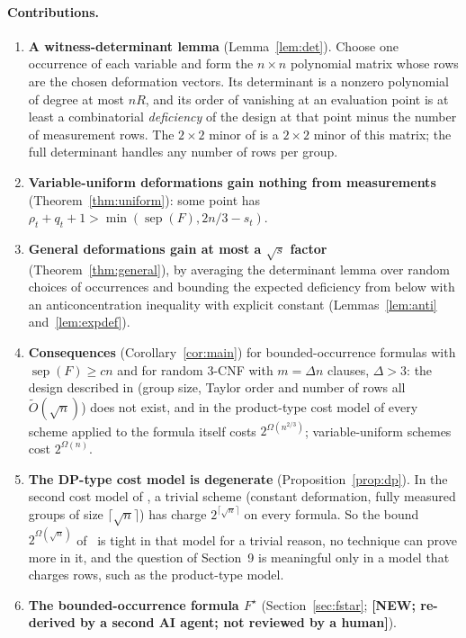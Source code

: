 \documentclass[11pt,a4paper]{article}
\newcommand{\NEWR}{\textbf{[NEW; re-derived by a second AI agent; not reviewed by a human]}}
\theoremstyle{definition}
\theoremstyle{remark}
\newcommand{\sep}{\operatorname{sep}}
\begin{document}
\paragraph{Contributions.}
\begin{enumerate}
\item \textbf{A witness-determinant lemma} (Lemma~\ref{lem:det}). Choose one occurrence of
 each variable and form the $n\times n$ polynomial matrix whose rows are the chosen
 deformation vectors. Its determinant is a nonzero polynomial of degree at most $nR$, and its
 order of vanishing at an evaluation point is at least a combinatorial \emph{deficiency} of
 the design at that point minus the number of measurement rows. The $2\times2$ minor of
 \cite[Section~9]{DL} is a $2\times 2$ minor of this matrix; the full determinant handles any
 number of rows per group.
\item \textbf{Variable-uniform deformations gain nothing from measurements}
 (Theorem~\ref{thm:uniform}): some point has $\rho_t+q_t+1>\min(\sep(F),2n/3-s_t)$.
\item \textbf{General deformations gain at most a $\sqrt{s}$ factor}
 (Theorem~\ref{thm:general}), by averaging the determinant lemma over random choices of
 occurrences and bounding the expected deficiency from below with an anticoncentration
 inequality with explicit constant (Lemmas~\ref{lem:anti} and~\ref{lem:expdef}).
\item \textbf{Consequences} (Corollary~\ref{cor:main}) for bounded-occurrence formulas with
 $\sep(F)\ge cn$ and for random 3-CNF with $m=\Delta n$ clauses, $\Delta>3$: the design
 described in \cite[Section~9]{DL} (group size, Taylor order and number of rows all
 $\tilde O(\sqrt n)$) does not exist, and in the product-type cost model of
 \cite[Section~5.2]{DL} every scheme applied to the formula itself costs
 $2^{\Omega(n^{2/3})}$; variable-uniform schemes cost $2^{\Omega(n)}$.
\item \textbf{The DP-type cost model is degenerate} (Proposition~\ref{prop:dp}). In the second
 cost model of \cite[Section~5.2]{DL}, a trivial scheme (constant deformation, fully measured
 groups of size $\lceil\sqrt n\rceil$) has charge $2^{\lceil\sqrt n\rceil}$ on every formula.
 So the bound $2^{\Omega(\sqrt n)}$ of~\cite{DL} is tight in that model for a trivial reason,
 no technique can prove more in it, and the question of Section~9 is meaningful only in a
 model that charges rows, such as the product-type model.
\item \textbf{The bounded-occurrence formula $F^\star$} (Section~\ref{sec:fstar}; \NEWR).

\end{enumerate}
\end{document}
